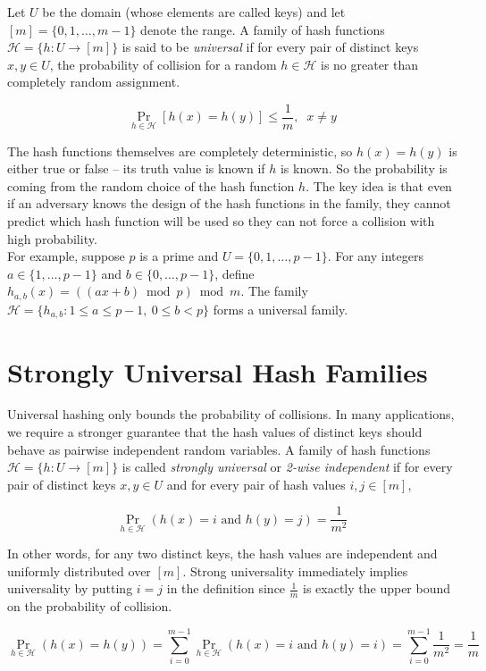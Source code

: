 \noindent Let $U$ be the domain (whose elements are called keys) and let $[m]=\{0,1,\dots,m-1\}$ denote the 
range. A family of hash functions $\mathcal H=\{h:U\to [m]\}$ is said to be 
\emph{universal} if for every pair of distinct keys $x,y\in U$, the probability of collision for a random 
$h \in \mathcal H$ is no greater than completely random assignment.

\[
\Pr_{h \in \mathcal H}[h(x)=h(y)]\le \frac1m, \;\; x \neq y
\]

The hash functions themselves are completely deterministic, so $h(x)=h(y)$ is either true or false -- its truth 
value is known if $h$ is known. So the probability is coming from the random choice of the 
hash function $h$. The key idea is that even if an adversary knows the design of the hash functions 
in the family, they cannot predict which hash function will be used so they can not force a 
collision with high probability. \\


\noindent For example, suppose $p$ is a prime and $U=\{0,1,\dots,p-1\}$. For any integers
$a\in\{1,\dots,p-1\}$ and $b\in\{0,\dots,p-1\}$, define $h_{a,b}(x)=((ax+b)\bmod p)\bmod m$. The 
family $\mathcal H=\{h_{a,b}:1\le a\le p-1,\ 0\le b<p\}$ forms a universal family.

\section{Strongly Universal Hash Families}

Universal hashing only bounds the probability of collisions. In many
applications, we require a stronger guarantee that the hash values of distinct keys should 
behave as pairwise independent random variables. A family of hash 
functions $\mathcal H=\{h:U\to [m]\}$ is called \emph{strongly universal} 
or \emph{2-wise independent} if for every pair of distinct keys $x,y\in U$ and 
for every pair of hash values $i,j\in[m]$,

\[
\Pr\limits_{h \in \mathcal H}(h(x)=i \text{ and } h(y)=j)=\frac1{m^2}
\]


In other words, for any two distinct keys, the hash values are independent and
uniformly distributed over $[m]$. Strong universality 
immediately implies universality by putting $i=j$ in the definition since $\frac{1}{m}$ is exactly the upper 
bound on the probability of collision.

\[
\Pr\limits_{h \in \mathcal H}(h(x)=h(y))
=\sum_{i=0}^{m-1}\Pr\limits_{h \in \mathcal H}(h(x)=i \text{ and } h(y)=i)
=\sum_{i=0}^{m-1}\frac1{m^2}
=\frac1m
\]

